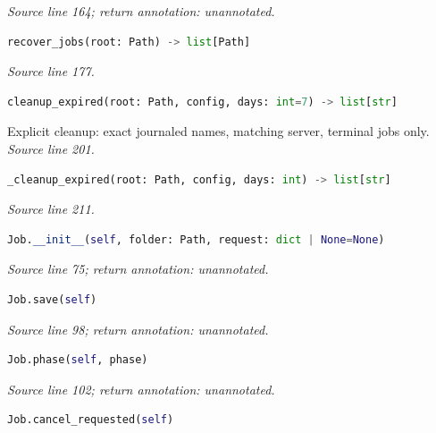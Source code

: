 {\small \textit{Source line 164; return annotation: unannotated.}}



\begin{lstlisting}[language=Python]
recover_jobs(root: Path) -> list[Path]
\end{lstlisting}


{\small \textit{Source line 177.}}



\begin{lstlisting}[language=Python]
cleanup_expired(root: Path, config, days: int=7) -> list[str]
\end{lstlisting}


{\small Explicit cleanup: exact journaled names, matching server, terminal jobs only. \textit{Source line 201.}}



\begin{lstlisting}[language=Python]
_cleanup_expired(root: Path, config, days: int) -> list[str]
\end{lstlisting}


{\small \textit{Source line 211.}}



\begin{lstlisting}[language=Python]
Job.__init__(self, folder: Path, request: dict | None=None)
\end{lstlisting}


{\small \textit{Source line 75; return annotation: unannotated.}}



\begin{lstlisting}[language=Python]
Job.save(self)
\end{lstlisting}


{\small \textit{Source line 98; return annotation: unannotated.}}



\begin{lstlisting}[language=Python]
Job.phase(self, phase)
\end{lstlisting}


{\small \textit{Source line 102; return annotation: unannotated.}}



\begin{lstlisting}[language=Python]
Job.cancel_requested(self)
\end{lstlisting}


